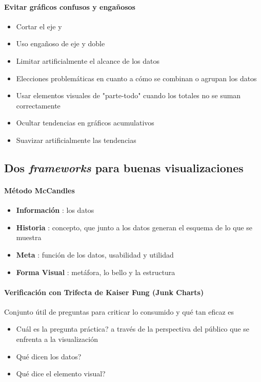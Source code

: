 \paragraph{Evitar gráficos confusos y engañosos}
\begin{itemize}
    \item {Cortar el eje y}
    \item {Uso engañoso de eje y doble}
    \item {Limitar artificialmente el alcance de los datos}
    \item {Elecciones problemáticas en cuanto a cómo se combinan o agrupan los datos}
    \item {Usar elementos visuales de "parte-todo" cuando los totales no se suman correctamente}
    \item {Ocultar tendencias en gráficos acumulativos}
    \item {Suavizar artificialmente las tendencias}
\end{itemize}

\subsection{Dos \textit{frameworks} para buenas visualizaciones}
\paragraph{Método McCandles}
\begin{itemize}
    \item {\textbf{Información} : los datos}
    \item {\textbf{Historia} : concepto, que junto a los datos generan el esquema de lo que se muestra}
    \item {\textbf{Meta} : función de los datos, usabilidad y utilidad}
    \item {\textbf{Forma Visual} : metáfora, lo bello y la estructura}
\end{itemize}

\paragraph{Verificación con Trifecta de Kaiser Fung (Junk Charts)}
Conjunto útil de preguntas para criticar lo consumido y qué tan eficaz es
\begin{itemize}
    \item {Cuál es la pregunta práctica? a través de la perspectiva del público que se enfrenta a la visualización}
    \item {Qué dicen los datos?}
    \item {Qué dice el elemento visual?}
\end{itemize}


